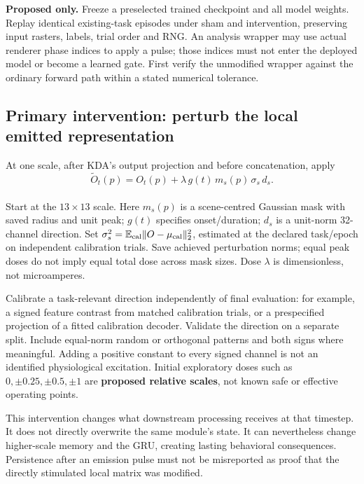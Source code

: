 \documentclass[
  10pt,
]{article}
\begin{document}
\textbf{Proposed only.} Freeze a preselected trained checkpoint and all
model weights. Replay identical existing-task episodes under sham and
intervention, preserving input rasters, labels, trial order and RNG. An
analysis wrapper may use actual renderer phase indices to apply a pulse;
those indices must not enter the deployed model or become a learned
gate. First verify the unmodified wrapper against the ordinary forward
path within a stated numerical tolerance.

\subsection{Primary intervention: perturb the local emitted
representation}\label{primary-intervention-perturb-the-local-emitted-representation}

At one scale, after KDA's output projection and before concatenation,
apply\\
\[
\widetilde O_t(p)=O_t(p)+\lambda\,g(t)\,m_s(p)\,\sigma_s\,d_s.
\]\\
Start at the \(13\times13\) scale. Here \(m_s(p)\) is a scene-centred
Gaussian mask with saved radius and unit peak; \(g(t)\) specifies
onset/duration; \(d_s\) is a unit-norm 32-channel direction. Set
\(\sigma_s^2=\mathbb E_{\rm cal}\|O-\mu_{\rm cal}\|_2^2\), estimated at
the declared task/epoch on independent calibration trials. Save achieved
perturbation norms; equal peak doses do not imply equal total dose
across mask sizes. Dose \(\lambda\) is dimensionless, not microamperes.

Calibrate a task-relevant direction independently of final evaluation:
for example, a signed feature contrast from matched calibration trials,
or a prespecified projection of a fitted calibration decoder. Validate
the direction on a separate split. Include equal-norm random or
orthogonal patterns and both signs where meaningful. Adding a positive
constant to every signed channel is not an identified physiological
excitation. Initial exploratory doses such as \(0,\pm0.25,\pm0.5,\pm1\)
are \textbf{proposed relative scales}, not known safe or effective
operating points.

This intervention changes what downstream processing receives at that
timestep. It does not directly overwrite the same module's state. It can
nevertheless change higher-scale memory and the GRU, creating lasting
behavioral consequences. Persistence after an emission pulse must not be
misreported as proof that the directly stimulated local matrix was
modified.
\end{document}
